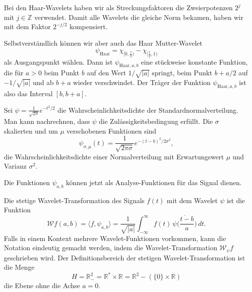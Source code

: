 \begin{beispiel}
Bei den Haar-Wavelets haben wir als Streckungsfaktoren die Zweierpotenzen
$2^j$ mit $j\in\mathbb Z$ verwendet.
Damit alle Wavelets die gleiche Norm bekamen, haben wir mit dem Faktor
$2^{-j/2}$ kompensiert.

Selbstverständlich können wir aber auch das Haar Mutter-Wavelet
\[
\psi_{\text{Haar}} = \chi_{[0,\frac12)} - \chi_{[\frac12,1)}
\]
als Ausgangspunkt wählen.
Dann ist $\psi_{\text{Haar},a,b}$ eine stückweise konstante Funktion,
die für $a>0$ beim Punkt $b$ auf den Wert $1/\sqrt{|a|}$ springt,
beim Punkt $b+a/2$ auf $-1/\sqrt{|a|}$ und ab $b+a$ wieder verschwindet.
Der Träger der Funktion $\psi_{\text{Haar},a,b}$ ist also das Interval
$[b,b+a]$.
\end{beispiel}

\begin{beispiel}
Sei $\psi=\frac1{\sqrt{2\pi}} e^{-t^2/2}$ die Wahrscheinlichkeitsdichte
der Standardnormalverteilung.
Man kann nachrechnen, dass $\psi$ die Zulässigkeitsbedingung erfüllt. 
Die $\sigma$ skalierten und um $\mu$ verschobenen Funktionen sind
\[
\psi_{\sigma,\mu}(t)
=
\frac{1}{\sqrt{2\pi\sigma}} e^{-(t-b)^2/2\sigma^2},
\]
die Wahrscheinlichkeitsdichte einer Normalverteilung mit Erwartungswert $\mu$
und Varianz $\sigma^2$.
\end{beispiel}

Die Funktionen $\psi_{a,b}$ können jetzt als Analyse-Funktionen für das
Signal dienen.

\begin{definition}
\label{cwt:definition}
Die stetige Wavelet-Transformation des Signals $f(t)$ mit dem Wavelet
$\psi$ ist die Funktion
\begin{equation}
\mathcal{W}f (a,b)
=
\langle f,\psi_{a,b}\rangle
=
\frac{1}{\sqrt{|a|}}\int_{-\infty}^\infty f(t)\,\overline{
\psi\biggl(\frac{t-b}{a}\biggr)}\,dt.
\label{cwt:definition:eq}
\end{equation}
Falls in einem Kontext mehrere Wavelet-Funktionen vorkommen, kann die
Notation eindeutig gemacht werden, indem die Wavelet-Transformation
$\mathcal{W}_{\psi}f$ geschrieben wird.
Der Definitionsbereich der stetigen Wavelet-Transformation ist die Menge
\[
H
=
\mathbb R^2_-
=
\mathbb R^*\times \mathbb R
=
\mathbb R^2 - (\{0\}\times \mathbb R)
\]
die Ebene ohne die Achse $a=0$.
\end{definition}

